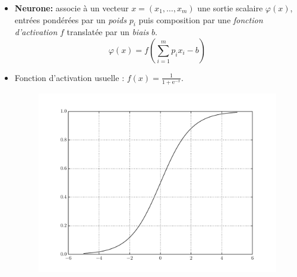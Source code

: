 \clearpage
{}

\begin{slide}

\begin{itemize}

	\item \textbf{Neurone:} associe à un vecteur $x = (x_1, \ldots, x_m)$ une sortie scalaire $\varphi(x)$, entrées pondérées par un \textit{poids} $p_i$ puis composition par une \textit{fonction d'activation} $f$ translatée par un \textit{biais} $b$.
	\begin{equation*}
		\varphi(x) = f (\sum_{i=1}^m p_i x_i - b) 
	\end{equation*}

	\item Fonction d'activation usuelle : $f(x) = \frac{1}{1 + \mathrm{e}^{-x}}$.

	\begin{figure}[h!]
	\centering
	\includegraphics[width=0.8\linewidth]{schemas/sigmoide.pdf}
	\end{figure}

\end{itemize}

\end{slide}

\clearpage
{}

